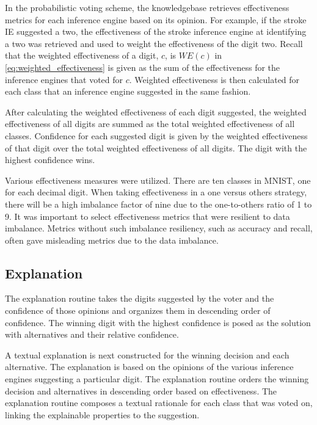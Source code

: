 In the probabilistic voting scheme, the knowledgebase retrieves effectiveness
metrics for each inference engine based on its opinion. For example, if the
stroke IE suggested a two, the effectiveness of the stroke inference engine at
identifying a two was retrieved and used to weight the effectiveness of the
digit two. Recall that the weighted effectiveness of a digit, $c$, is $WE(c)$ in
\eqref{eq:weighted_effectiveness} is given as the sum of the effectiveness for
the inference engines that voted for $c$. Weighted effectiveness is then
calculated for each class that an inference engine suggested in the same
fashion.

After calculating the weighted effectiveness of each digit suggested, the
weighted effectiveness of all digits are summed as the total weighted
effectiveness of all classes. Confidence for each suggested digit is given by
the weighted effectiveness of that digit over the total weighted effectiveness
of all digits. The digit with the highest confidence wins.

Various effectiveness measures were utilized. There are ten classes in MNIST,
one for each decimal digit. When taking effectiveness in a one versus others
strategy, there will be a high imbalance factor of nine due to the one-to-others
ratio of 1 to 9. It was important to select effectiveness metrics that were
resilient to data imbalance. Metrics without such imbalance resiliency, such as
accuracy and recall, often gave misleading metrics due to the data imbalance.

\subsection{Explanation}

The explanation routine takes the digits suggested by the voter and the
confidence of those opinions and organizes them in descending order of
confidence. The winning digit with the highest confidence is posed as the
solution with alternatives and their relative confidence.

A textual explanation is next constructed for the winning decision and each
alternative. The explanation is based on the opinions of the various inference
engines suggesting a particular digit. The explanation routine orders the
winning decision and alternatives in descending order based on effectiveness.
The explanation routine composes a textual rationale for each class that was
voted on, linking the explainable properties to the suggestion.


